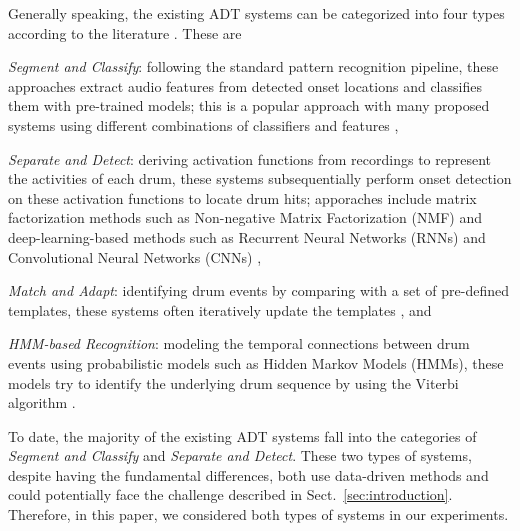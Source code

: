 \documentclass{article}
\begin{document}
Generally speaking, the existing ADT systems can be categorized into four types according to the literature \cite{Gillet2008_taslp, Paulus09_DrumStructure_PhD}. These are
\begin{inparaenum}[(i)]
	\item \textit{Segment and Classify}: following the standard pattern recognition pipeline, these approaches extract audio features from detected onset locations and classifies them with pre-trained models; this is a popular approach with many proposed systems using different combinations of classifiers and features \cite{SteelantTDBLM05_DrumTransSVM_Chapter, Gillet2008_taslp, SouzaBN15_CymbalClassi_IJCNN, Gajhede2016},
	\item \textit{Separate and Detect}: deriving activation functions from recordings to represent the activities of each drum, these systems subsequentially perform onset detection on these activation functions to locate drum hits; apporaches include matrix factorization methods such as Non-negative Matrix Factorization (NMF) \cite{DittmarG14_DrumTranscription_DAFX, Roebel2015, Wu2015_ismir} and deep-learning-based methods such as Recurrent Neural Networks (RNNs) \cite{Southall2016, Vogl2016, Vogl2017_icassp} and Convolutional Neural Networks (CNNs) \cite{Southall2017, Vogl2017_ismir},
	\item \textit{Match and Adapt}: identifying drum events by comparing with a set of pre-defined templates, these systems often iteratively update the templates \cite{YoshiiGO07_DrumTrans_IEEE-TASLP}, and
	\item \textit{HMM-based Recognition}: modeling the temporal connections between drum events using probabilistic models such as Hidden Markov Models (HMMs), these models try to identify the underlying drum sequence by using the Viterbi algorithm \cite{PaulusK09_DrumTransHMM_JASMP, Dzhambazov14_DrumTransHMM_AES}. 
\end{inparaenum} 

To date, the majority of the existing ADT systems fall into the categories of \textit{Segment and Classify} and \textit{Separate and Detect}. These two types of systems, despite having the fundamental differences, both use data-driven methods and could potentially face the challenge described in Sect.~\ref{sec:introduction}.
Therefore, in this paper, we considered both types of systems in our experiments.
\end{document}

